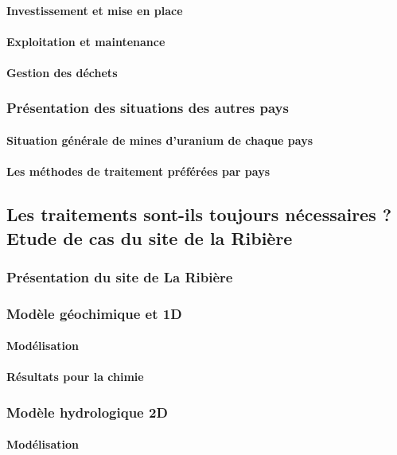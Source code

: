 \documentclass{article}
\begin{document}
\paragraph{Investissement et mise en place}
\paragraph{Exploitation et maintenance}
\paragraph{Gestion des déchets }
\subsubsection{Présentation des situations des autres pays}
\paragraph{Situation générale de mines d’uranium de chaque pays}
\paragraph{Les méthodes de traitement préférées par pays}

\subsection{Les traitements sont-ils toujours nécessaires ? Etude de cas du site de la Ribière}
\subsubsection{Présentation du site de La Ribière}
\subsubsection{Modèle géochimique et 1D}
\paragraph{Modélisation}
\paragraph{Résultats pour la chimie}
\subsubsection{Modèle hydrologique 2D}
\paragraph{Modélisation}
\end{document}
